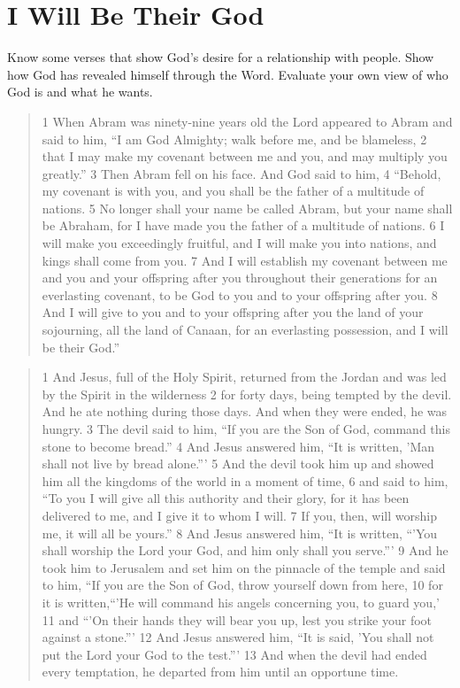 \chapter{I Will Be Their God}

\begin{goals}
\goal Know some verses that show God's desire for a relationship with people.
\goal Show how God has revealed himself through the Word.
\goal Evaluate your own view of who God is and what he wants.
\end{goals}

\intro

\lipsum[4]

\bible

\begin{quote}
1 When Abram was ninety-nine years old the Lord appeared to Abram and said to him, ``I am God Almighty; walk before me, and be blameless, 2 that I may make my covenant between me and you, and may multiply you greatly.'' 3 Then Abram fell on his face. And God said to him, 4 ``Behold, my covenant is with you, and you shall be the father of a multitude of nations. 5 No longer shall your name be called Abram, but your name shall be Abraham, for I have made you the father of a multitude of nations. 6 I will make you exceedingly fruitful, and I will make you into nations, and kings shall come from you. 7 And I will establish my covenant between me and you and your offspring after you throughout their generations for an everlasting covenant, to be God to you and to your offspring after you. 8 And I will give to you and to your offspring after you the land of your sojourning, all the land of Canaan, for an everlasting possession, and I will be their God.'' 
\end{quote}

\begin{quote}
1 And Jesus, full of the Holy Spirit, returned from the Jordan and was led by the Spirit in the wilderness 2 for forty days, being tempted by the devil. And he ate nothing during those days. And when they were ended, he was hungry. 3 The devil said to him, ``If you are the Son of God, command this stone to become bread.'' 4 And Jesus answered him, ``It is written, 'Man shall not live by bread alone.''' 5 And the devil took him up and showed him all the kingdoms of the world in a moment of time, 6 and said to him, ``To you I will give all this authority and their glory, for it has been delivered to me, and I give it to whom I will. 7 If you, then, will worship me, it will all be yours.'' 8 And Jesus answered him, ``It is written, ``'You shall worship the Lord your God, and him only shall you serve.''' 9 And he took him to Jerusalem and set him on the pinnacle of the temple and said to him, ``If you are the Son of God, throw yourself down from here, 10 for it is written,``'He will command his angels concerning you, to guard you,' 11 and ``'On their hands they will bear you up, lest you strike your foot against a stone.''' 12 And Jesus answered him, ``It is said, 'You shall not put the Lord your God to the test.''' 13 And when the devil had ended every temptation, he departed from him until an opportune time. 
\end{quote}

